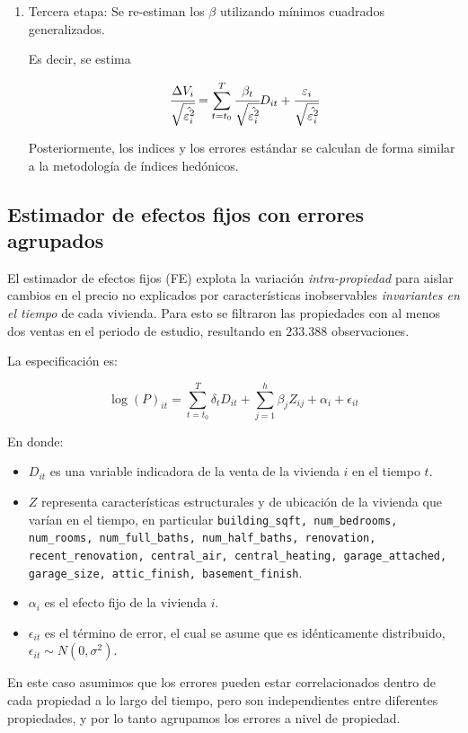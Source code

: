 \documentclass[conference]{IEEEtran}
\begin{document}
\begin{enumerate}
  \item Tercera etapa: Se re-estiman los $\beta$ utilizando mínimos cuadrados generalizados.
  
  Es decir, se estima 

  \[ \cfrac{\Delta V_i}{\sqrt{\hat{\varepsilon_i^2}}} = \sum_{t=t_0}^{T} \cfrac{\beta_t}{\sqrt{\hat{\varepsilon_i^2}}} D_{it} + \cfrac{\varepsilon_{i}}{\sqrt{\hat{\varepsilon_i^2}}} \]

  Posteriormente, los indices y los errores estándar se calculan de forma similar a la metodología de índices hedónicos.

\end{enumerate}


\subsection{Estimador de efectos fijos con errores agrupados}

El estimador de efectos fijos (FE) explota la variación \emph{intra-propiedad} para aislar cambios en el precio no explicados por características inobservables \emph{invariantes en el tiempo} de cada vivienda. 
Para esto se filtraron las propiedades con al menos dos ventas en el periodo de estudio, resultando en $233.388$ observaciones.

La especificación es:

\[ \log(P)_{it} = \sum_{t=t_0}^{T} \delta_t D_{it} + \sum_{j=1}^h \beta_j Z_{ij} + \alpha_i + \epsilon_{it} \]

En donde:

\begin{itemize}
  \item $D_{it}$ es una variable indicadora de la venta de la vivienda $i$ en el tiempo $t$.
  \item $Z$ representa características estructurales y de ubicación de la vivienda que varían en el tiempo, en particular 
  \texttt{building\_sqft, num\_bedrooms, num\_rooms, num\_full\_baths, num\_half\_baths, renovation, recent\_renovation, central\_air, central\_heating, garage\_attached, garage\_size, attic\_finish, basement\_finish}.
  \item $\alpha_i$ es el efecto fijo de la vivienda $i$.
  \item $\epsilon_{it}$ es el término de error, el cual se asume que es idénticamente distribuido, $\epsilon_{it} \sim N(0, \sigma^2)$.
\end{itemize}

En este caso asumimos que los errores pueden estar correlacionados dentro de cada propiedad a lo largo del tiempo, pero son independientes entre diferentes propiedades, y por lo tanto 
agrupamos los errores a nivel de propiedad.
\end{document}
